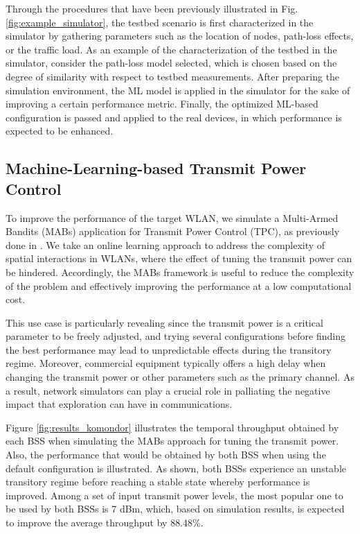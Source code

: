 \documentclass[journal]{IEEEtran}
\begin{document}
	Through the procedures that have been previously illustrated in Fig. \ref{fig:example_simulator}, the testbed scenario is first characterized in the simulator by gathering parameters such as the location of nodes, path-loss effects, or the traffic load. As an example of the characterization of the testbed in the simulator, consider the path-loss model selected, which is chosen based on the degree of similarity with respect to testbed measurements. After preparing the simulation environment, the ML model is applied in the simulator for the sake of improving a certain performance metric. Finally, the optimized ML-based configuration is passed and applied to the real devices, in which performance is expected to be enhanced.
	
	\subsection{Machine-Learning-based Transmit Power Control}
	To improve the performance of the target WLAN, we simulate a Multi-Armed Bandits (MABs) application for Transmit Power Control (TPC), as previously done in \cite{wilhelmi}. We take an online learning approach to address the complexity of spatial interactions in WLANs, where the effect of tuning the transmit power can be hindered. Accordingly, the MABs framework is useful to reduce the complexity of the problem and effectively improving the performance at a low computational cost. 
	
	This use case is particularly revealing since the transmit power is a critical parameter to be freely adjusted, and trying several configurations before finding the best performance may lead to unpredictable effects during the transitory regime. Moreover, commercial equipment typically offers a high delay when changing the transmit power or other parameters such as the primary channel. As a result, network simulators can play a crucial role in palliating the negative impact that exploration can have in communications.
	
	Figure \ref{fig:results_komondor} illustrates the temporal throughput obtained by each BSS when simulating the MABs approach for tuning the transmit power. Also, the performance that would be obtained by both BSS when using the default configuration is illustrated. As shown, both BSSs experience an unstable transitory regime before reaching a stable state whereby performance is improved. Among a set of input transmit power levels, the most popular one to be used by both BSSs is 7 dBm, which, based on simulation results, is expected to improve the average throughput by 88.48\%.
	
\end{document}
